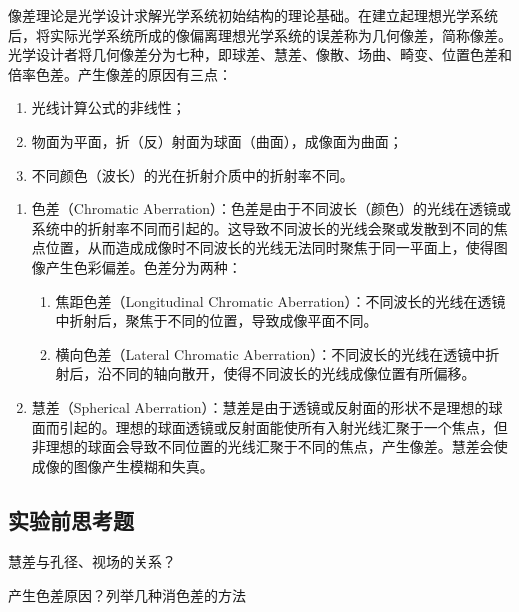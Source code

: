 \documentclass[dvipsnames, svgnames,a4paper,11pt]{article}
\begin{document}
像差理论是光学设计求解光学系统初始结构的理论基础。在建立起理想光学系统后，将实际光学系统所成的像偏离理想光学系统的误差称为几何像差，简称像差。光学设计者将几何像差分为七种，即球差、慧差、像散、场曲、畸变、位置色差和倍率色差。产生像差的原因有三点：
	\begin{enumerate}
		\item 光线计算公式的非线性；
		\item 物面为平面，折（反）射面为球面（曲面），成像面为曲面；
		\item 不同颜色（波长）的光在折射介质中的折射率不同。
	\end{enumerate}
	
	\begin{enumerate}
		\item 色差（Chromatic Aberration）：色差是由于不同波长（颜色）的光线在透镜或系统中的折射率不同而引起的。这导致不同波长的光线会聚或发散到不同的焦点位置，从而造成成像时不同波长的光线无法同时聚焦于同一平面上，使得图像产生色彩偏差。色差分为两种：
			\begin{enumerate}
				\item 焦距色差（Longitudinal Chromatic Aberration）：不同波长的光线在透镜中折射后，聚焦于不同的位置，导致成像平面不同。
				\item 横向色差（Lateral Chromatic Aberration）：不同波长的光线在透镜中折射后，沿不同的轴向散开，使得不同波长的光线成像位置有所偏移。
			\end{enumerate}

		
		\item 慧差（Spherical Aberration）：慧差是由于透镜或反射面的形状不是理想的球面而引起的。理想的球面透镜或反射面能使所有入射光线汇聚于一个焦点，但非理想的球面会导致不同位置的光线汇聚于不同的焦点，产生像差。慧差会使成像的图像产生模糊和失真。
	\end{enumerate}

	

\subsection{实验前思考题}
	\begin{question}
		慧差与孔径、视场的关系？
	\end{question}
		
		
			
		
		
		
		
		

	\begin{question}
		产生色差原因？列举几种消色差的方法
	\end{question}
\end{document}
